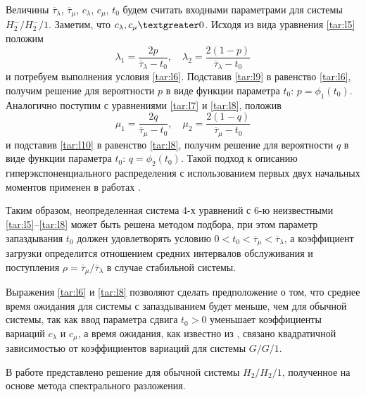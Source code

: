 Величины $\overline{\tau}_{\lambda}$, $\overline{\tau}_{\mu}$, $c_{\lambda}$, $c_{\mu}$, $t_0$ будем считать входными параметрами для системы $H_2^-/H_2^-/1$. Заметим, что $c_{\lambda},c_{\mu}\textgreater0$. Исходя из вида уравнения \eqref{tar:l5} положим %
\begin{equation}
\label{tar:l9}
\lambda_1=\frac{2p}{\overline{\tau}_{\lambda}-t_0},\quad \lambda_2=\frac{2(1-p)}{\overline{\tau}_{\lambda}-t_0}
\end{equation}
и потребуем выполнения условия \eqref{tar:l6}. Подставив \eqref{tar:l9} в равенство \eqref{tar:l6}, получим решение для вероятности $p$ в  виде функции параметра $t_0$: $p=\phi_1(t_0)$. 
Аналогично поступим с уравнениями \eqref{tar:l7} и \eqref{tar:l8}, положив %
\begin{equation}
\label{tar:l10}
\mu_1=\frac{2q}{\overline{\tau}_{\mu}-t_0},\quad 
\mu_2=\frac{2(1-q)}{\overline{\tau}_{\mu}-t_0}
\end{equation}
и подставив  \eqref{tar:l10} в равенство \eqref{tar:l8}, получим решение для вероятности $q$ в виде функции параметра $t_0$: $q=\phi_2(t_0)$. Такой подход к описанию гиперэкспоненциального распределения с использованием первых двух начальных моментов  применен в работах \cite{tar:tarasov_2, tar:bib:1, tar:bib:9, tar:tarasov_3, tar:bib:10}.

Таким образом, неопределенная система 4-х уравнений с 6-ю неизвестными \eqref{tar:l5}--\eqref{tar:l8} может быть решена методом подбора, при этом параметр запаздывания $t_0$ должен удовлетворять условию $0<t_0<\overline{\tau}_{\mu}<\overline{\tau}_{\lambda}$, а коэффициент загрузки определится отношением средних интервалов обслуживания и поступления $\rho=\overline{\tau}_{\mu}/\overline{\tau}_{\lambda}$ в случае стабильной системы.

Выражения \eqref{tar:l6} и \eqref{tar:l8} позволяют сделать предположение о том, что среднее время ожидания для системы с запаздыванием будет меньше, чем для обычной системы, так как ввод параметра сдвига $t_0>0$ уменьшает коэффициенты вариаций $c_{\lambda}$ и $c_{\mu}$, а время ожидания, как известно из \cite{tar:klein}, связано
квадратичной зависимостью от коэффициентов вариаций для системы $G/G/1$.

\smallskip

В работе \cite{tar:tarasov_2, tar:tarasov_3} представлено решение для обычной системы $H_2/H_2/1$, полученное на основе метода спектрального разложения.

